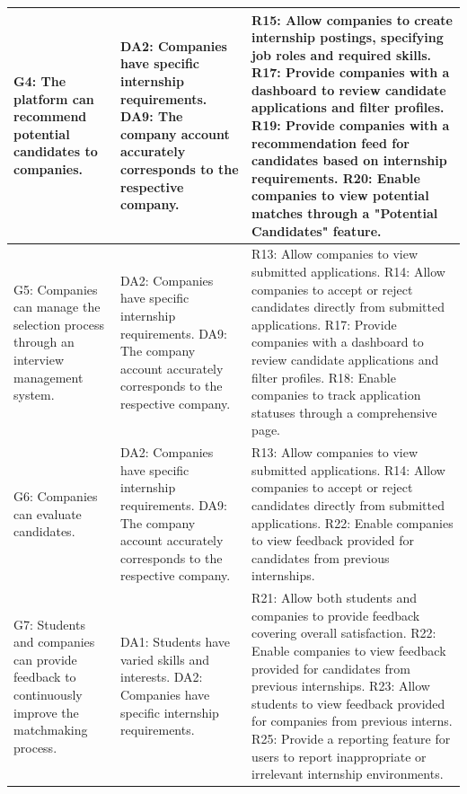 \begin{longtable}{| p{} | p{} | p{} |}
    G4: The platform can recommend potential candidates to companies. & DA2: Companies have specific internship requirements. \newline DA9: The company account accurately corresponds to the respective company. & R15: Allow companies to create internship postings, specifying job roles and required skills. \newline R17: Provide companies with a dashboard to review candidate applications and filter profiles. \newline R19: Provide companies with a recommendation feed for candidates based on internship requirements. \newline R20: Enable companies to view potential matches through a "Potential Candidates" feature. \\ \hline

    G5: Companies can manage the selection process through an interview management system. & DA2: Companies have specific internship requirements. \newline DA9: The company account accurately corresponds to the respective company. & R13: Allow companies to view submitted applications. \newline R14: Allow companies to accept or reject candidates directly from submitted applications. \newline R17: Provide companies with a dashboard to review candidate applications and filter profiles. \newline R18: Enable companies to track application statuses through a comprehensive page. \\ \hline

    G6: Companies can evaluate candidates. & DA2: Companies have specific internship requirements. \newline DA9: The company account accurately corresponds to the respective company. & R13: Allow companies to view submitted applications. \newline R14: Allow companies to accept or reject candidates directly from submitted applications. \newline R22: Enable companies to view feedback provided for candidates from previous internships. \\ \hline

    G7: Students and companies can provide feedback to continuously improve the matchmaking process. & DA1: Students have varied skills and interests. \newline DA2: Companies have specific internship requirements. & R21: Allow both students and companies to provide feedback covering overall satisfaction. \newline R22: Enable companies to view feedback provided for candidates from previous internships. \newline R23: Allow students to view feedback provided for companies from previous interns. \newline R25: Provide a reporting feature for users to report inappropriate or irrelevant internship environments. \\ \hline


\end{longtable}
